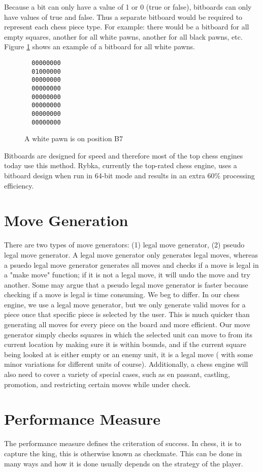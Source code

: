 \documentclass[11pt,letterpaper,twocolumn]{article}
\begin{document}
Because a bit can only have a value of 1 or 0 (true or false), bitboards can only have values of true and false. Thus a separate bitboard would be required to represent
each chess piece type. For example: there would be a bitboard for all empty squares, another for all white pawns, another for all black pawns, etc.
Figure \ref{bitboard-rep} shows an example of a bitboard for all white pawns.
\begin{figure}[h] %
  \caption{A white pawn is on position B7}
  \begin{verbatim}
  00000000
  01000000
  00000000
  00000000
  00000000
  00000000
  00000000
  00000000 
  \end{verbatim}
  \label{bitboard-rep}
\end{figure}
Bitboards are designed for speed and therefore most of the top chess engines today use this method.
Rybka, currently the top-rated chess engine, uses a bitboard design when run in 64-bit mode and results in an extra 60\% processing efficiency\cite{rybka1}.

\section{Move Generation}
There are two types of move generators: (1) legal move generator, (2) pseudo legal move generator. A legal move generator only generates legal moves, whereas a
psuedo legal move generator generates all moves and checks if a move is legal in a "make move" function; if it is not a legal move, it will undo the move and try another.
Some may argue that a pseudo legal move generator is faster because checking if a move is legal is time consuming.
We beg to differ. In our chess engine, we use a legal move generator, but we only generate valid moves for a piece once that specific piece is selected by the user.
This is much quicker than generating all moves for every piece on the board and more efficient. Our move generator simply checks squares in which the selected unit can
move to from its current location by making sure it is within bounds, and if the current square being looked at is either empty or an enemy unit, it is a legal move (
with some minor variations for different units of course). Additionally, a chess engine will also need to cover a variety of special cases, such as en passant, castling,
promotion, and restricting certain moves while under check.

\section{Performance Measure}
The performance measure defines the criteration of success. In chess, it is to capture the king, this is otherwise known as checkmate. This can be done in many ways
and how it is done usually depends on the strategy of the player.
\end{document}
